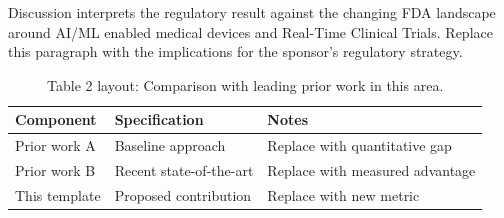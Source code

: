 
Discussion interprets the regulatory result against the changing FDA landscape around AI/ML enabled medical devices and Real-Time Clinical Trials. Replace this paragraph with the implications for the sponsor's regulatory strategy.

\begin{table}[H]
\caption{Table 2 layout: Comparison with leading prior work in this area.}
\label{tab:discussion_compare}
\centering
\begin{tabular}{>{\raggedright\arraybackslash}p{3.4cm} >{\raggedright\arraybackslash}p{4.6cm} >{\raggedright\arraybackslash}p{5.4cm}}
\toprule
\textbf{Component} & \textbf{Specification} & \textbf{Notes} \\
\midrule
  Prior work A & Baseline approach & Replace with quantitative gap \\
  Prior work B & Recent state-of-the-art & Replace with measured advantage \\
  This template & Proposed contribution & Replace with new metric \\
\bottomrule
\end{tabular}
\end{table}
